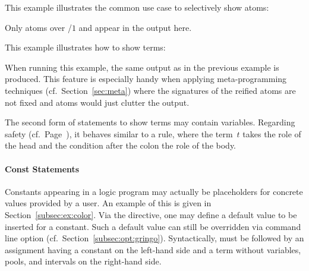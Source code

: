 \begin{example}
This example illustrates the common use case to selectively show atoms:

Only atoms over /$1$ and  appear in the output here.
\end{example}

\begin{example}
This example illustrates how to show terms:
%

%
When running this example,
the same output as in the previous example is produced.
This feature is especially handy when applying meta-programming techniques (cf.~Section~\ref{sec:meta})
where the signatures of the reified atoms are not fixed and  atoms would just clutter the output.
\end{example}

\begin{note}
The second form of  statements to show terms may contain variables.
Regarding safety (cf.\ Page~\pageref{pg:safe}), it behaves similar to a rule,
where the term~$t$ takes the role of the head
and the condition after the colon the role of the body.
\end{note}

\paragraph{Const Statements}
%
Constants appearing in a logic program may actually be placeholders for
concrete values provided by a user.
An example of this is given in Section~\ref{subsec:ex:color}.
Via the  directive,
one may define a default value to be inserted for a constant.
Such a default value can still be overridden via command line option
 (cf.\ Section~\ref{subsec:opt:gringo}).
Syntactically,  must be followed by an assignment having
a constant on the left-hand side and a term without variables, pools, and intervals on the right-hand side.

